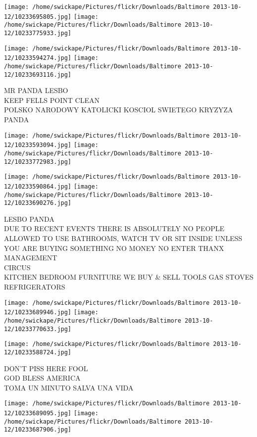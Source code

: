 \documentclass[10pt,letterpaper]{article}
\begin{document}
\texttt{[image: /home/swickape/Pictures/flickr/Downloads/Baltimore 2013-10-12/10233695805.jpg]}
\texttt{[image: /home/swickape/Pictures/flickr/Downloads/Baltimore 2013-10-12/10233775933.jpg]}

\texttt{[image: /home/swickape/Pictures/flickr/Downloads/Baltimore 2013-10-12/10233594274.jpg]}
\texttt{[image: /home/swickape/Pictures/flickr/Downloads/Baltimore 2013-10-12/10233693116.jpg]}

MR PANDA LESBO\\
KEEP FELLS POINT CLEAN\\
POLSKO NARODOWY KATOLICKI KOSCIOL SWIETEGO KRYZYZA\\
PANDA
\pagebreak

\texttt{[image: /home/swickape/Pictures/flickr/Downloads/Baltimore 2013-10-12/10233593094.jpg]}
\texttt{[image: /home/swickape/Pictures/flickr/Downloads/Baltimore 2013-10-12/10233772983.jpg]}

\texttt{[image: /home/swickape/Pictures/flickr/Downloads/Baltimore 2013-10-12/10233590864.jpg]}
\texttt{[image: /home/swickape/Pictures/flickr/Downloads/Baltimore 2013-10-12/10233690276.jpg]}

LESBO PANDA\\
DUE TO RECENT EVENTS THERE IS ABSOLUTELY NO PEOPLE ALLOWED TO USE BATHROOMS, WATCH TV OR SIT INSIDE UNLESS YOU ARE BUYING SOMETHING NO MONEY NO ENTER THANX MANAGEMENT\\
CIRCUS\\
KITCHEN BEDROOM FURNITURE WE BUY \& SELL TOOLS GAS STOVES REFRIGERATORS
\pagebreak

\texttt{[image: /home/swickape/Pictures/flickr/Downloads/Baltimore 2013-10-12/10233689946.jpg]}
\texttt{[image: /home/swickape/Pictures/flickr/Downloads/Baltimore 2013-10-12/10233770633.jpg]}

\vspace{0.25in}
\texttt{[image: /home/swickape/Pictures/flickr/Downloads/Baltimore 2013-10-12/10233588724.jpg]}

DON'T PISS HERE FOOL\\
GOD BLESS AMERICA\\
TOMA UN MINUTO SALVA UNA VIDA
\pagebreak

\texttt{[image: /home/swickape/Pictures/flickr/Downloads/Baltimore 2013-10-12/10233689095.jpg]}
\texttt{[image: /home/swickape/Pictures/flickr/Downloads/Baltimore 2013-10-12/10233687906.jpg]}
\end{document}
